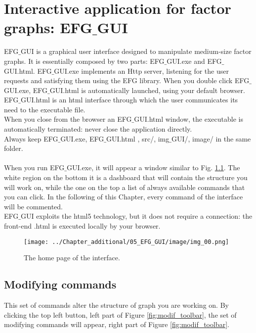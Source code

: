 \newpage
\chapter{Interactive application for factor graphs: EFG$\_$GUI}
\label{chap:GUI}

EFG$\_$GUI is a graphical user interface designed to manipulate medium-size factor graphs. It is essentially composed by two parts: EFG$\_$GUI.exe and EFG$\_$GUI.html.
EFG$\_$GUI.exe implements an Http server, listening for the user requests and satisfying them using the EFG library.
When you double click  EFG$\_$GUI.exe, EFG$\_$GUI.html is automatically launched, using your default browser. EFG$\_$GUI.html is an html interface through which the user communicates its need to the executable file.
\\
When you close from the browser an EFG$\_$GUI.html window, the executable is automatically terminated: never close the application directly.
\\
Always keep EFG$\_$GUI.exe, EFG$\_$GUI.html , src/, img$\_$GUI/, image/ in the same folder.
\\
\\
When you run EFG$\_$GUI.exe, it will appear a window similar to Fig. \ref{fig:home}.
The white region on the bottom it is a dashboard that will contain the structure you will work on, while the one on the top a list of always available commands that you can click. In the following of this Chapter, every command  of the interface will be commented.
\\
EFG$\_$GUI exploits the html5 technology, but it does not require a connection: the front-end .html is executed locally by your browser.

\begin{figure}
	\centering
	\texttt{[image: ../Chapter\_additional/05\_EFG\_GUI/image/img\_00.png]}
	\caption{The home page of the interface.}
	\label{fig:home}
\end{figure} 

\section{Modifying commands}

This set of commands alter the structure of graph you are working on. By clicking the top left button, left part of Figure \ref{fig:modif_toolbar}, the set of modifying commands will appear, right part of Figure \ref{fig:modif_toolbar}.

